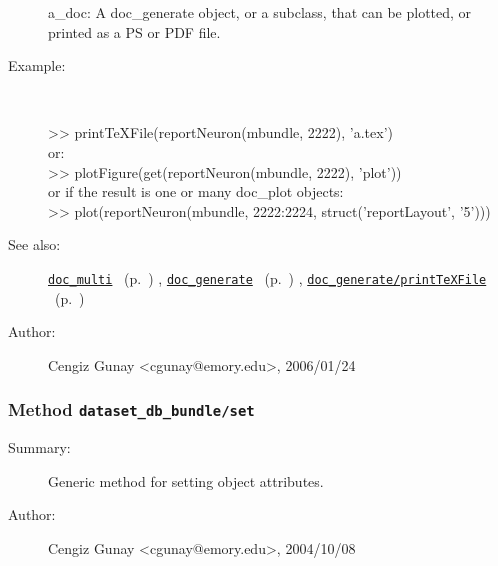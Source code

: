 \begin{description}
 	a\_doc: A doc\_generate object, or a subclass, that can be plotted, or
		printed as a PS or PDF file.
%
\item[Example:]~
\begin{lyxcode} >> printTeXFile(reportNeuron(mbundle, 2222), 'a.tex')
\\%
 or:
\\%
 >> plotFigure(get(reportNeuron(mbundle, 2222), 'plot'))
\\%
 or if the result is one or many doc\_plot objects:
\\%
 >> plot(reportNeuron(mbundle, 2222:2224, struct('reportLayout', '5')))
\\%
\end{lyxcode}
%
\item[See also:]%
\hyperlink{ref_doc_multi}{\texttt{doc\_multi}}%
\ (p.~\pageref{ref_doc_multi})%
%
, \hyperlink{ref_doc_generate}{\texttt{doc\_generate}}%
\ (p.~\pageref{ref_doc_generate})%
%
, \hyperlink{ref_doc_generate__printTeXFile}{\texttt{doc\_generate/printTeXFile}}%
\ (p.~\pageref{ref_doc_generate__printTeXFile})%
%
%
\item[Author:]%
Cengiz Gunay <cgunay@emory.edu>, 2006/01/24
%
\end{description}
\methodline%
\subsubsection[Method \texttt{set}]{Method \texttt{dataset\_db\_bundle/set}}%
%
\label{ref_dataset_db_bundle__set}%
\hypertarget{ref_dataset_db_bundle__set}{}%
\begin{description}
\item[Summary:]Generic method for setting object attributes.
%
%
%
%
%
%
%
\item[Author:]%
Cengiz Gunay <cgunay@emory.edu>, 2004/10/08
%
\end{description}
\methodline%
